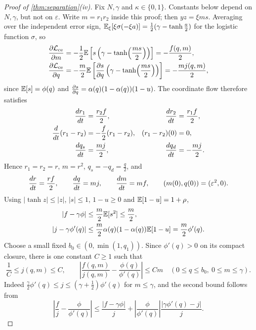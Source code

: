 \begin{proof}[Proof of \cref{thm:separation}(iv)]
Fix $N,\gamma$ and $\kappa\in\{0,1\}$. Constants below depend on $N,\gamma$, but not on $\varepsilon$.
Write $m=r_1r_2$ inside this proof; then $y z=\xi m s$.
Averaging over the independent error sign, $\mathbb E_\xi[\xi\sigma(-\xi a)]=\tfrac{1}{2}(\gamma-\tanh\tfrac{a}{2})$ for the logistic function $\sigma$, so
\begin{align*}
 \frac{\partial \mathcal L_{\mathrm{ce}}}{\partial m}
 &=-\frac{1}{2}\mathbb E\left[s\left(\gamma-\tanh\!\left(\frac{m s}{2}\right)\right)\right]
 =-\frac{f(q,m)}{2},\\
 \frac{\partial \mathcal L_{\mathrm{ce}}}{\partial q}
 &=-\frac{m}{2}\mathbb E\left[\frac{\partial s}{\partial q}\left(\gamma-\tanh\!\left(\frac{m s}{2}\right)\right)\right]
 =-\frac{m j(q,m)}{2},
\end{align*}
since $\mathbb E[s]=\phi(q)$ and $\frac{\partial s}{\partial q}=\alpha(q)(1-\alpha(q))(1-u)$.
The coordinate flow therefore satisfies
\begin{align*}
 \frac{d r_1}{d t}&=\frac{r_2f}{2},&\frac{d r_2}{d t}&=\frac{r_1f}{2},\\
 \frac{d}{dt}(r_1-r_2)&=-\frac{f}{2}(r_1-r_2),&(r_1-r_2)(0)&=0,\\
 \frac{d q_s}{d t}&=\frac{m j}{2},&\frac{d q_d}{d t}&=-\frac{m j}{2}.
\end{align*}
Hence $r_1=r_2=r$, $m=r^2$, $q_s=-q_d=\tfrac{q}{2}$, and
\[
 \frac{d r}{d t}=\frac{r f}{2},\qquad \frac{d q}{d t}=m j,\qquad
 \frac{d m}{d t}=m f,\qquad (m(0),q(0))=(\varepsilon^2,0).
\]
Using $|\tanh z|\le|z|$, $|s|\le1$, $1-u\ge0$ and $\mathbb E[1-u]=1+\rho$,
\begin{align*}
 |f-\gamma \phi|&\le\frac{m}{2}\mathbb E[s^2]\le\frac{m}{2},\\
 \left|j-\gamma\phi'(q)\right|&\le\frac{m}{2}\alpha(q)(1-\alpha(q))\mathbb E[1-u]=\frac{m}{2}\phi'(q).
\end{align*}
Choose a small fixed $b_0\in(0,\min(1,q_1))$.
Since $\phi'(q)>0$ on its compact closure, there is one constant $C\ge1$ such that
\begin{equation}
 \frac{1}{C}\le j(q,m)\le C,\qquad
 \left|\frac{f(q,m)}{j(q,m)}-\frac{\phi(q)}{\phi'(q)}\right|\le Cm
 \quad(0\le q\le b_0,\ 0\le m\le\gamma).
 \label{eq:ce-ratio-bound}
\end{equation}
Indeed $\tfrac{\gamma}{2}\phi'(q)\le j\le(\gamma+\tfrac{1}{2})\phi'(q)$ for $m\le\gamma$, and the second bound follows from
\[
 \left|\frac{f}{j}-\frac{\phi}{\phi'(q)}\right|
 \le\frac{|f-\gamma \phi|}{j}
 +\left|\frac{\phi}{\phi'(q)}\right|\frac{|\gamma\phi'(q)-j|}{j}.
\]
\end{proof}
